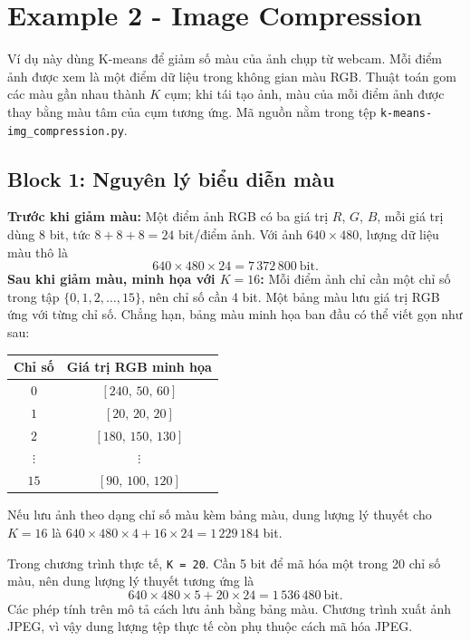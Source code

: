 \section{Example 2 - Image Compression}

Ví dụ này dùng K-means để giảm số màu của ảnh chụp từ webcam. Mỗi điểm ảnh
được xem là một điểm dữ liệu trong không gian màu RGB. Thuật toán gom các
màu gần nhau thành $K$ cụm; khi tái tạo ảnh, màu của mỗi điểm ảnh được thay
bằng màu tâm của cụm tương ứng. Mã nguồn nằm trong tệp
\texttt{k-means-img\_compression.py}.

\subsection{Block 1: Nguyên lý biểu diễn màu}

\textbf{Trước khi giảm màu:} Một điểm ảnh RGB có ba giá trị $R$, $G$, $B$,
mỗi giá trị dùng 8 bit, tức $8+8+8=24$ bit/điểm ảnh. Với ảnh
$640\times480$, lượng dữ liệu màu thô là
\begin{equation}
    640\times480\times24=7\,372\,800\ \text{bit}.
\end{equation}
\textbf{Sau khi giảm màu, minh họa với $K=16$:} Mỗi điểm ảnh chỉ cần một
chỉ số trong tập $\{0,1,2,\ldots,15\}$, nên chỉ số cần 4 bit. Một bảng màu
lưu giá trị RGB ứng với từng chỉ số. Chẳng hạn, bảng màu minh họa ban đầu
có thể viết gọn như sau:
\begin{center}
    \begin{tabular}{cc}
        \toprule
        \textbf{Chỉ số} & \textbf{Giá trị RGB minh họa} \\
        \midrule
        $0$ & $[240,\,50,\,60]$ \\
        $1$ & $[20,\,20,\,20]$ \\
        $2$ & $[180,\,150,\,130]$ \\
        $\vdots$ & $\vdots$ \\
        $15$ & $[90,\,100,\,120]$ \\
        \bottomrule
    \end{tabular}
\end{center}
Nếu lưu ảnh theo dạng chỉ số màu kèm bảng màu, dung lượng lý thuyết cho
$K=16$ là $640\times480\times4+16\times24=1\,229\,184$ bit.

Trong chương trình thực tế, \texttt{K = 20}. Cần 5 bit để mã hóa một trong
20 chỉ số màu, nên dung lượng lý thuyết tương ứng là
\begin{equation}
    640\times480\times5+20\times24=1\,536\,480\ \text{bit}.
\end{equation}
Các phép tính trên mô tả cách lưu ảnh bằng bảng màu. Chương trình xuất ảnh
JPEG, vì vậy dung lượng tệp thực tế còn phụ thuộc cách mã hóa JPEG.

